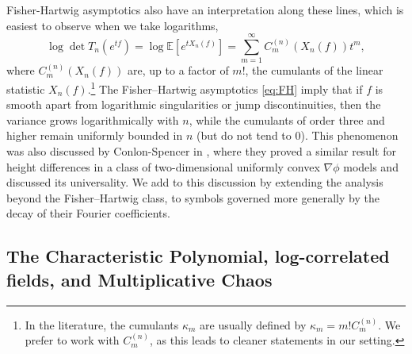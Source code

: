 \documentclass[11pt]{amsart}
\theoremstyle{plain}
\theoremstyle{remark}
\numberwithin{equation}{section}
\begin{document}
Fisher-Hartwig asymptotics also have an interpretation along these lines, which is easiest to observe when we take logarithms,
$$
\log \det T_n(e^{tf})=\log \mathbb E[e^{t X_n(f)}]=\sum_{m=1}^\infty { C_m^{(n)}(X_n(f)) t^m},$$
where \(C_m^{(n)}(X_n(f))\) are, up to a factor of \(m!\), the cumulants of the linear statistic \(X_n(f)\).\footnote{In the literature, the cumulants \(\kappa_m\) are usually defined by
$
\kappa_m = m! C_m^{(n)}.
$
We prefer to work with \(C_m^{(n)}\), as this leads to cleaner statements in our setting.}
The Fisher--Hartwig asymptotics \eqref{eq:FH} imply that if \(f\) is smooth apart from logarithmic singularities or jump discontinuities, then the variance grows logarithmically with \(n\), while the cumulants of order three and higher remain uniformly bounded in \(n\) (but do not tend to $0$). This phenomenon was also discussed by Conlon-Spencer in \cite{CS}, where they proved a similar result for height differences in a class of two-dimensional uniformly convex \(\nabla\phi\) models and discussed its universality. We add to this discussion by extending the analysis beyond the Fisher–Hartwig class, to symbols governed more generally by the decay of their Fourier coefficients.


\subsection{The Characteristic Polynomial, log-correlated fields, and Multiplicative Chaos}\label{subsec:logcorfield}
\end{document}
